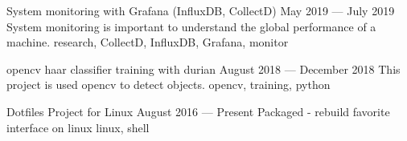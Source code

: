 
\begin{projects}

	\project%
		{System monitoring with Grafana (InfluxDB, CollectD)}
		{May 2019 --- July 2019}
		{}
		{System monitoring is important to understand the global performance of a machine.}
		{research, CollectD, InfluxDB, Grafana, monitor }

	\project%
		{opencv haar classifier training with durian}
		{August 2018 --- December 2018}
		{}
		{This project is used opencv to detect objects.}
		{opencv, training, python}
		
	\project%
		{Dotfiles Project for Linux}
		{August 2016 --- Present}
		{}
		{Packaged - rebuild favorite interface on linux}
		{linux, shell}
		
\end{projects}